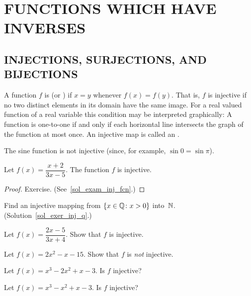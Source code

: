 \chapter{FUNCTIONS WHICH HAVE INVERSES}\label{inverses}

\section{INJECTIONS, SURJECTIONS, AND BIJECTIONS}
A function $f$ is
 (or
) if $x = y$ whenever $f(x) = f(y)$.  That is, $f$ is injective if no two
distinct elements in its domain have the same image.  For a real valued function of a real
variable this condition may be interpreted graphically: A function is one-to-one if and only
if each horizontal line intersects the graph of the function at most once. An injective map is
called an
.

\begin{exam}  The sine function is not injective (since, for example, $\sin 0 = \sin \pi$).
\end{exam}

\begin{exam}\label{exam_inj_fcn} Let $f(x) = \dfrac{x+2}{3x-5}$.  The function $f$ is injective.
\end{exam}

\begin{proof} Exercise.  (See~\ref{sol_exam_inj_fcn}.)  \ns  \end{proof}

\begin{exer}\label{exer_inj_q}  Find an injective mapping from $\{x \in \mathbb{Q}\colon  x > 0\}$
into~$\mathbb{N}$. (Solution~\ref{sol_exer_inj_q}.)
\end{exer}

\begin{prob} Let $f(x) = \dfrac{2x-5}{3x+4}$. Show that $f$ is injective.
\end{prob}

\begin{prob}  Let $f(x) = 2x^2 - x - 15$. Show that $f$ is \emph{not} injective.
\end{prob}

\begin{prob} Let $f(x) = x^3 - 2x^2 + x - 3$. Is $f$ injective?
\end{prob}

\begin{prob} Let $f(x) = x^3 - x^2 + x - 3$. Is $f$ injective?
\end{prob}

